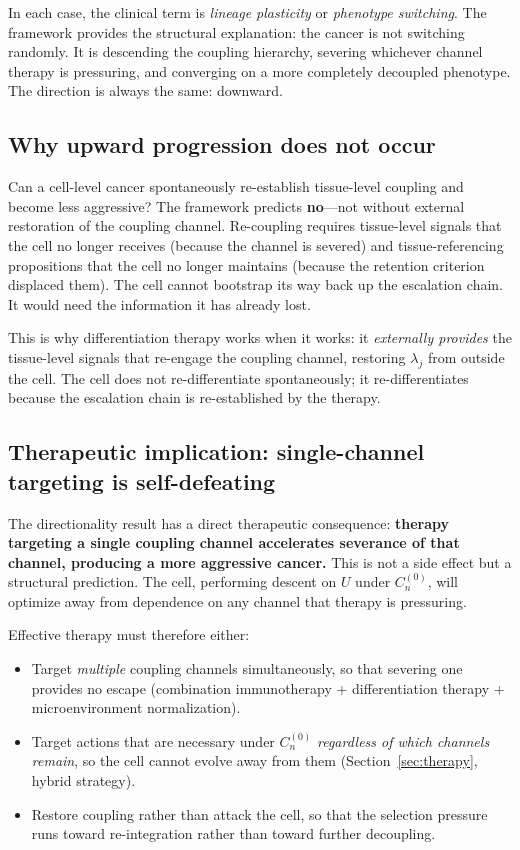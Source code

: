 \documentclass[11pt]{article}
\theoremstyle{definition}
\theoremstyle{remark}
\begin{document}
In each case, the clinical term is \emph{lineage plasticity} or
\emph{phenotype switching}. The framework provides the structural
explanation: the cancer is not switching randomly. It is descending
the coupling hierarchy, severing whichever channel therapy is
pressuring, and converging on a more completely decoupled phenotype.
The direction is always the same: downward.

\subsection{Why upward progression does not occur}

Can a cell-level cancer spontaneously re-establish tissue-level
coupling and become less aggressive? The framework predicts
\textbf{no}---not without external restoration of the coupling
channel. Re-coupling requires tissue-level signals that the cell
no longer receives (because the channel is severed) and
tissue-referencing propositions that the cell no longer maintains
(because the retention criterion displaced them). The cell cannot
bootstrap its way back up the escalation chain. It would need the
information it has already lost.

This is why differentiation therapy works when it works: it
\emph{externally provides} the tissue-level signals that re-engage
the coupling channel, restoring $\lambda_j$ from outside the cell.
The cell does not re-differentiate spontaneously; it re-differentiates
because the escalation chain is re-established by the therapy.

\subsection{Therapeutic implication: single-channel targeting is
self-defeating}

The directionality result has a direct therapeutic consequence:
\textbf{therapy targeting a single coupling channel accelerates
severance of that channel, producing a more aggressive cancer.}
This is not a side effect but a structural prediction. The cell,
performing descent on $U$ under $C_n^{(0)}$, will optimize away from
dependence on any channel that therapy is pressuring.

Effective therapy must therefore either:
\begin{itemize}
\item Target \emph{multiple} coupling channels simultaneously, so
   that severing one provides no escape (combination immunotherapy +
   differentiation therapy + microenvironment normalization).
\item Target actions that are necessary under $C_n^{(0)}$
   \emph{regardless of which channels remain}, so the cell cannot
   evolve away from them (Section~\ref{sec:therapy}, hybrid strategy).
\item Restore coupling rather than attack the cell, so that the
   selection pressure runs toward re-integration rather than toward
   further decoupling.
\end{itemize}
\end{document}
